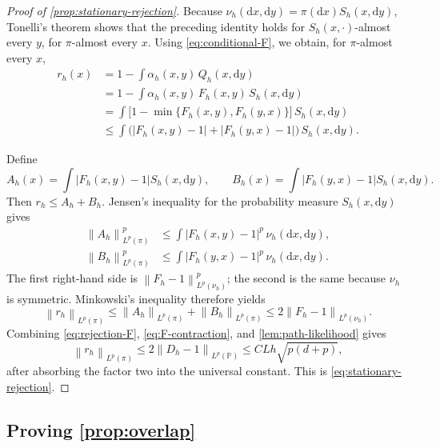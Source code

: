 \documentclass[11pt]{article}
\newcommand{\norm}[1]{\left\lVert #1\right\rVert}
\newcommand{\abs}[1]{\left\lvert #1\right\rvert}
\newcommand{\1}{\mathbf 1}
\newcommand{\df}{\mathrm{d}}
\begin{document}
\begin{proof}[Proof of \cref{prop:stationary-rejection}]
		Because \(\nu_h(\df x,\df y)=\pi(\df x)S_h(x,\df y)\),
		Tonelli's theorem shows that the preceding identity holds for
		\(S_h(x,\cdot)\)-almost every \(y\), for \(\pi\)-almost every \(x\).
		Using \eqref{eq:conditional-F}, we obtain,
		for \(\pi\)-almost every \(x\),
		\begin{align*}
			r_h(x)
			&= 1 - \int \alpha_h(x,y) \, Q_h(x, \df y) \\
			&=1 - \int \alpha_h(x,y) \, F_h(x,y) \, S_h(x, \df y) \\
			&=\int
			\bigl[1-\min\{F_h(x,y),F_h(y,x)\}\bigr]
			\,S_h(x,\df y)\\
			&\leq
			\int
			\bigl(\abs{F_h(x,y)-1}+\abs{F_h(y,x)-1}\bigr)
			\,S_h(x,\df y).
		\end{align*}
		
		Define
		\[
		A_h(x)=\int\abs{F_h(x,y)-1}S_h(x,\df y),
		\qquad
		B_h(x)=\int\abs{F_h(y,x)-1}S_h(x,\df y).
		\]
		Then \(r_h\leq A_h+B_h\).  Jensen's inequality for the probability measure
		\(S_h(x,\df y)\) gives
		\begin{align*}
			\norm{A_h}_{L^p(\pi)}^p
			&\leq\int\abs{F_h(x,y)-1}^p\,\nu_h(\df x,\df y),\\
			\norm{B_h}_{L^p(\pi)}^p
			&\leq\int\abs{F_h(y,x)-1}^p\,\nu_h(\df x,\df y).
		\end{align*}
		The first right-hand side is
		\(\norm{F_h-1}_{L^p(\nu_h)}^p\); the second is the same because \(\nu_h\)
		is symmetric.  Minkowski's inequality therefore yields
		\begin{equation}\label{eq:rejection-F}
			\norm{r_h}_{L^p(\pi)}
			\leq
			\norm{A_h}_{L^p(\pi)}+\norm{B_h}_{L^p(\pi)}
			\leq2\norm{F_h-1}_{L^p(\nu_h)}.
		\end{equation}
		Combining \eqref{eq:rejection-F}, \eqref{eq:F-contraction}, and
		\cref{lem:path-likelihood} gives
		\[
		\norm{r_h}_{L^p(\pi)}
		\leq 2\norm{D_h-1}_{L^p(\mathbb P)}
		\leq CLh\sqrt{p(d+p)},
		\]
		after absorbing the factor two into the universal constant.  This is
		\eqref{eq:stationary-rejection}.
	\end{proof}
	
	\subsection{Proving \cref{prop:overlap}} \label{app:overlap}
	
\end{document}
